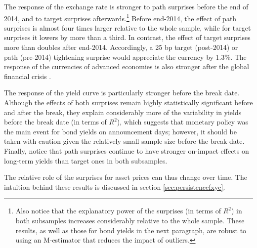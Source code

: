 \documentclass[a4paper, 12pt]{article}
\begin{document}
{\begin{normalsize}
\begin{landscape}
\begin{table}
\begin{center}
\begin{threeparttable}
					\end{threeparttable}
				\end{center}
			\end{table}
		\end{landscape}
	\end{normalsize}
}

The response of the exchange rate is stronger to path surprises before the end of 2014, and to target surprises afterwards.\footnote{Also notice that the explanatory power of the surprises (in terms of \(R^{2}\)) in both subsamples increases considerably relative to the whole sample. These results, as well as those for bond yields in the next paragraph, are robust to using an M-estimator that reduces the impact of outliers.} 
Before end-2014, the effect of path surprises is almost four times larger relative to the whole sample, while for target surprises it lowers by more than a third. 
In contrast, the effect of target surprises more than doubles after end-2014. 
Accordingly, a 25 bp target (post-2014) or path (pre-2014) tightening surprise would appreciate the currency by 1.3\%. 	
The response of the currencies of advanced economies is also stronger after the global financial crisis \parencite{FerrariKearnsSchrimpf:2021}.

The response of the yield curve is particularly stronger before the break date. Although the effects of both surprises remain highly statistically significant before and after the break, they explain considerably more of the variability in yields before the break date (in terms of \(R^2\)), which suggests that monetary policy was the main event for bond yields on announcement days; however, it should be taken with caution given the relatively small sample size before the break date. Finally, notice that path surprises continue to have stronger on-impact effects on long-term yields than target ones in both subsamples. 

The relative role of the surprises for asset prices can thus change over time. The intuition behind these results is discussed in section \ref{sec:persistencefxyc}. 
\end{document}
